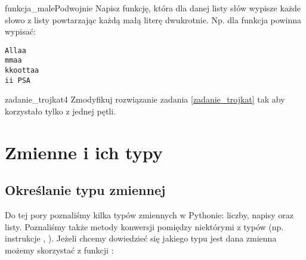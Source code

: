 \documentclass{pdfBooklets}
\begin{document}
\begin{Zadanie}{}{funkcja_malePodwojnie} %
Napisz funkcję, która dla danej listy słów wypisze każde słowo z listy powtarzając 
każdą małą literę dwukrotnie.
Np. dla  funkcja powinna wypisać:
\begin{Verbatim}
Allaa
mmaa
kkoottaa
ii PSA
\end{Verbatim}
\end{Zadanie}

\begin{Zadanie}{}{zadanie_trojkat4}
Zmodyfikuj rozwiązanie zadania \ref{zadanie_trojkat} tak aby korzystało tylko z jednej pętli.
\end{Zadanie}




\student{\clearpage}
\section{Zmienne i ich typy}

\subsection{Określanie typu zmiennej}

Do tej pory poznaliśmy kilka typów zmiennych w Pythonie: liczby, napisy oraz listy.
Poznaliśmy także metody konwersji pomiędzy niektórymi z typów (np. instrukcje , ).
Jeżeli chcemy dowiedzieć się jakiego typu jest dana zmienna możemy skorzystać z funkcji :
\end{document}
